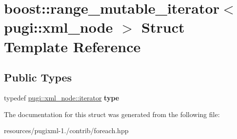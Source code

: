 \hypertarget{structboost_1_1range__mutable__iterator_3_01pugi_1_1xml__node_01_4}{\section{boost\+:\+:range\+\_\+mutable\+\_\+iterator$<$ pugi\+:\+:xml\+\_\+node $>$ Struct Template Reference}
\label{structboost_1_1range__mutable__iterator_3_01pugi_1_1xml__node_01_4}
}
\subsection*{Public Types}
\begin{DoxyCompactItemize}
\item 
\hypertarget{structboost_1_1range__mutable__iterator_3_01pugi_1_1xml__node_01_4_ac824e88c57d235ef4b417f87302e02af}{typedef \hyperlink{classpugi_1_1xml__node__iterator}{pugi\+::xml\+\_\+node\+::iterator} {\bfseries type}}\label{structboost_1_1range__mutable__iterator_3_01pugi_1_1xml__node_01_4_ac824e88c57d235ef4b417f87302e02af}

\end{DoxyCompactItemize}


The documentation for this struct was generated from the following file\+:\begin{DoxyCompactItemize}
\item 
resources/pugixml-\/1./contrib/foreach.\+hpp\end{DoxyCompactItemize}
